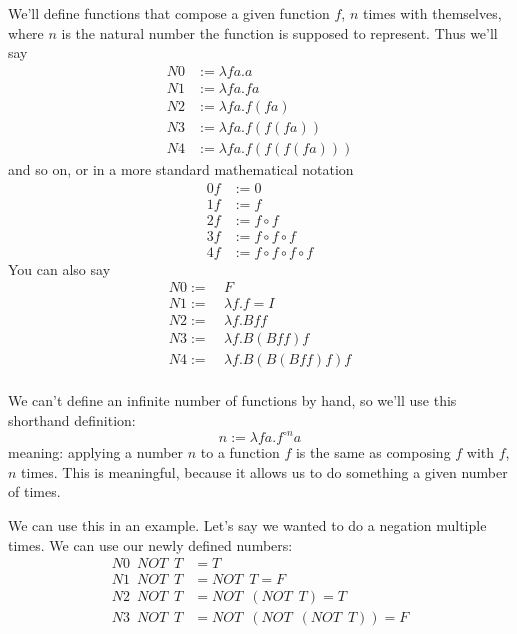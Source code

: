 \documentclass[11pt]{article}
\begin{document}
We'll define functions that compose a given function \(f\), \(n\) times with
themselves, where \(n\) is the natural number the function is supposed to
represent. Thus we'll say
\begin{align*}
	N0&:=\lambda fa.a\\
	N1&:=\lambda fa.fa\\
	N2&:=\lambda fa.f(fa)\\
	N3&:=\lambda fa.f(f(fa))\\
	N4&:=\lambda fa.f(f(f(fa)))
\end{align*}
and so on, or in a more standard mathematical notation
\begin{align*}
	0f&:=0\\
	1f&:=f\\
	2f&:=f\circ f\\
	3f&:=f\circ f\circ f\\
	4f&:=f\circ f\circ f\circ f
\end{align*}
You can also say
\begin{align*}
	N0:=&\:F\\
	N1:=&\:\lambda f.f=I\\
	N2:=&\:\lambda f.Bff\\
	N3:=&\:\lambda f.B(Bff)f\\
	N4:=&\:\lambda f.B(B(Bff)f)f\\
\end{align*}

We can't define an infinite number of functions by hand, so we'll use this
shorthand definition:
\[n:=\lambda fa.f^{\circ n}a\]
meaning: applying a number \(n\) to a function \(f\) is the same as composing
\(f\) with \(f\), \(n\) times. This is meaningful, because it allows us to do
something a given number of times.

We can use this in an example. Let's say we wanted to do a negation multiple
times. We can use our newly defined numbers:
\begin{align*}
	N0\enspace NOT\enspace T &= T\\
	N1\enspace NOT\enspace T &= NOT\enspace T = F\\
	N2\enspace NOT\enspace T &= NOT\enspace (NOT\enspace T) = T\\
	N3\enspace NOT\enspace T &= NOT\enspace (NOT\enspace (NOT\enspace T))=F
\end{align*}
\end{document}
